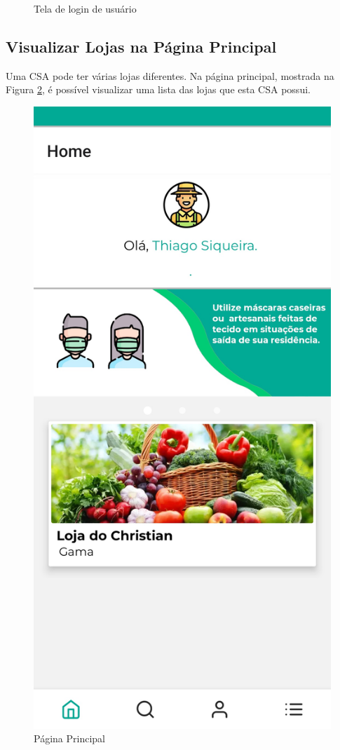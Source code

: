 \begin{figure}[h]
	\caption{Tela de login de usuário}
        \label{tela-login-csa-app}
\end{figure}

\subsection{Visualizar Lojas na Página Principal}
Uma CSA pode ter várias lojas diferentes. Na página principal, mostrada na Figura \ref{tela-principal-loja-app}, é possível visualizar uma lista das lojas que esta CSA possui.

\begin{figure}[h]
	\centering
	\includegraphics[keepaspectratio=true,scale=0.16]{figuras/principal.jpg}
	\caption{Página Principal}
        \label{tela-principal-loja-app}
\end{figure}


